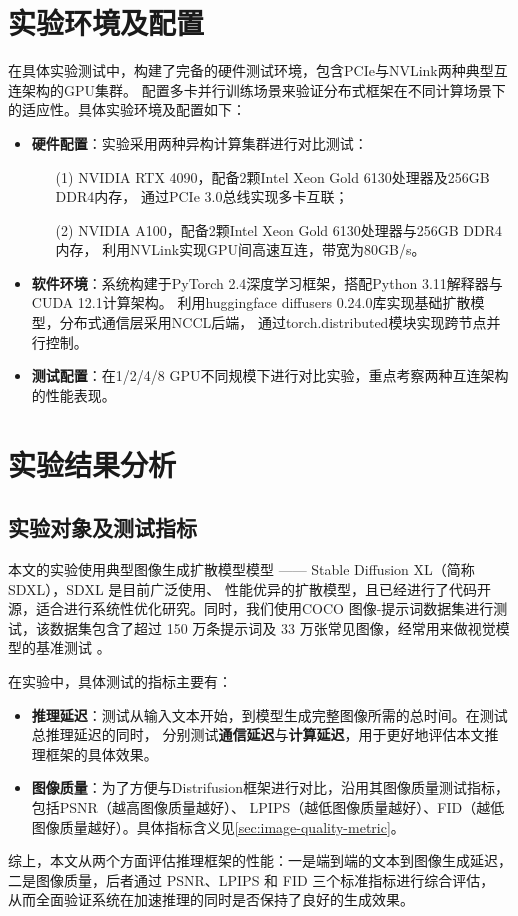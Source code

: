 \section{实验环境及配置}
\label{sec:exp-env}
在具体实验测试中，构建了完备的硬件测试环境，包含PCIe与NVLink两种典型互连架构的GPU集群。
配置多卡并行训练场景来验证分布式框架在不同计算场景下的适应性。具体实验环境及配置如下：
\begin{itemize}
    \item \textbf{硬件配置}：实验采用两种异构计算集群进行对比测试：
    \begin{itemize}
        \item [(1)] NVIDIA RTX 4090，配备2颗Intel Xeon Gold 6130处理器及256GB DDR4内存，
        通过PCIe 3.0总线实现多卡互联\cite{IntelXeonGold,A100}；
        \item [(2)] NVIDIA A100，配备2颗Intel Xeon Gold 6130处理器与256GB DDR4内存，
        利用NVLink实现GPU间高速互连，带宽为80GB/s\cite{IntelXeonGold, RTX4090}。
    \end{itemize}
    \item \textbf{软件环境}：系统构建于PyTorch 2.4深度学习框架\cite{PyTorch2.4}，搭配Python 3.11解释器与CUDA 12.1计算架构。
    利用huggingface diffusers 0.24.0库实现基础扩散模型\cite{huggingface}，分布式通信层采用NCCL后端，
    通过torch.distributed模块实现跨节点并行控制。
    \item \textbf{测试配置}：在1/2/4/8 GPU不同规模下进行对比实验，重点考察两种互连架构的性能表现。
\end{itemize}

\section{实验结果分析}
\subsection{实验对象及测试指标}
\label{sec:experiment-object}
\par
本文的实验使用典型图像生成扩散模型模型 —— Stable Diffusion XL（简称 SDXL），SDXL 是目前广泛使用、
性能优异的扩散模型，且已经进行了代码开源，适合进行系统性优化研究\cite{Podell2023SDXLIL}。同时，我们使用COCO
图像-提示词数据集进行测试，该数据集包含了超过 150 万条提示词及 33 万张常见图像，经常用来做视觉模型的基准测试
\cite{Chen2015MicrosoftCC}。
\par
在实验中，具体测试的指标主要有：
\begin{itemize}
    \item \textbf{推理延迟}：测试从输入文本开始，到模型生成完整图像所需的总时间。在测试总推理延迟的同时，
    分别测试\textbf{通信延迟}与\textbf{计算延迟}，用于更好地评估本文推理框架的具体效果。
    \item \textbf{图像质量}：为了方便与Distrifusion框架进行对比，沿用其图像质量测试指标，包括PSNR（越高图像质量越好）、
    LPIPS（越低图像质量越好）、FID（越低图像质量越好）。具体指标含义见\ref{sec:image-quality-metric}。
\end{itemize}
综上，本文从两个方面评估推理框架的性能：一是端到端的文本到图像生成延迟，
二是图像质量，后者通过 PSNR、LPIPS 和 FID 三个标准指标进行综合评估，
从而全面验证系统在加速推理的同时是否保持了良好的生成效果。

